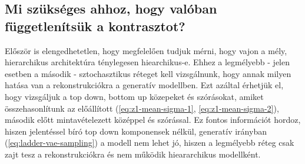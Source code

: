 \documentclass[12pt, english]{article}
\begin{document}
\newpage

\subsection{Mi szükséges ahhoz, hogy valóban függetlenítsük a kontrasztot?}

\vspace{5mm}

\par Először is elengedhetetlen, hogy megfelelően tudjuk mérni, hogy vajon a mély, hierarchikus architektúra ténylegesen hiearchikus-e. Ehhez a legmélyebb - jelen esetben a második - sztochasztikus réteget kell vizsgálnunk, hogy annak milyen hatása van a rekonstrukciókra a generatív modellben. Ezt azáltal érhetjük el, hogy vizsgáljuk a top down, bottom up közepeket és szórásokat, amiket összehasonlítunk az előállított (\ref{eq:z1-mean-sigma-1}, \ref{eq:z1-mean-sigma-2}), második előtt mintavételezett középpel és szórással. Ez fontos információt hordoz, hiszen jelentéssel bíró top down komponensek nélkül, generatív irányban (\ref{eq:ladder-vae-sampling}) a modell nem lehet jó, hiszen a legmélyebb réteg csak zajt tesz a rekonstrukciókra és nem működik hieararchikus modellként.

\vspace{4mm}
\end{document}

